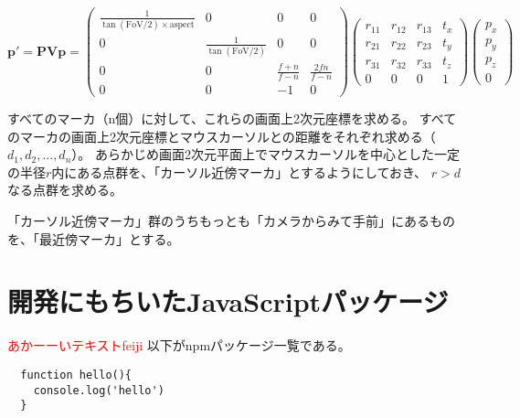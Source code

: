 $$
\bm{p'} =  
  \mathbf{P} \mathbf{V} \bm{p}
  =
  \begin{pmatrix}
    \frac{1}{\tan(\text{FoV}/2) \times \text{aspect}} & 0 & 0 & 0 \\
    0 & \frac{1}{\tan(\text{FoV}/2)} & 0 & 0 \\
    0 & 0 & \frac{f+n}{f-n} & \frac{2fn}{f-n} \\
    0 & 0 & -1 & 0
    \end{pmatrix}
    \begin{pmatrix}
      r_{11} & r_{12} & r_{13} & t_x \\
      r_{21} & r_{22} & r_{23} & t_y \\
      r_{31} & r_{32} & r_{33} & t_z \\
      0 & 0 & 0 & 1
    \end{pmatrix}    
    \begin{pmatrix}
    {p_x} \\
    {p_y} \\
    {p_z} \\
    {0}
    \end{pmatrix}
$$

すべてのマーカ（n個）に対して、これらの画面上2次元座標を求める。
すべてのマーカの画面上2次元座標とマウスカーソルとの距離をそれぞれ求める（$d_1, d_2, ..., d_n$）。
あらかじめ画面2次元平面上でマウスカーソルを中心とした一定の半径$r$内にある点群を、「カーソル近傍マーカ」とするようにしておき、
$r > d$なる点群を求める。

「カーソル近傍マーカ」群のうちもっとも「カメラからみて手前」にあるものを、「最近傍マーカ」とする。



\section{開発にもちいたJavaScriptパッケージ}
\textcolor{red}{あかーーいテキストfeiji}
以下がnpmパッケージ一覧である。

\begin{lstlisting}
  function hello(){
    console.log('hello')
  }
\end{lstlisting}



